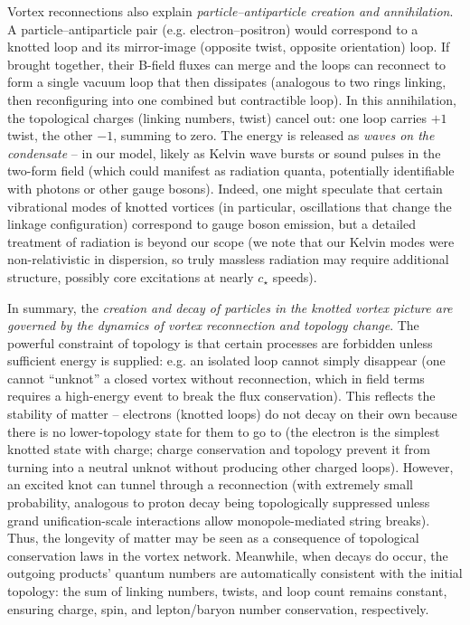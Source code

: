 \documentclass[12pt]{article}
\begin{document}
Vortex reconnections also explain \emph{particle–antiparticle creation and annihilation}. A particle–antiparticle pair (e.g. electron–positron) would correspond to a knotted loop and its mirror-image (opposite twist, opposite orientation) loop. If brought together, their B-field fluxes can merge and the loops can reconnect to form a single vacuum loop that then dissipates (analogous to two rings linking, then reconfiguring into one combined but contractible loop). In this annihilation, the topological charges (linking numbers, twist) cancel out: one loop carries $+1$ twist, the other $-1$, summing to zero. The energy is released as \emph{waves on the condensate} – in our model, likely as Kelvin wave bursts or sound pulses in the two-form field (which could manifest as radiation quanta, potentially identifiable with photons or other gauge bosons). Indeed, one might speculate that certain vibrational modes of knotted vortices (in particular, oscillations that change the linkage configuration) correspond to gauge boson emission, but a detailed treatment of radiation is beyond our scope (we note that our Kelvin modes were non-relativistic in dispersion, so truly massless radiation may require additional structure, possibly core excitations at nearly $c_{\star}$ speeds).

In summary, the \emph{creation and decay of particles in the knotted vortex picture are governed by the dynamics of vortex reconnection and topology change}. The powerful constraint of topology is that certain processes are forbidden unless sufficient energy is supplied: e.g. an isolated loop cannot simply disappear (one cannot “unknot” a closed vortex without reconnection, which in field terms requires a high-energy event to break the flux conservation). This reflects the stability of matter – electrons (knotted loops) do not decay on their own because there is no lower-topology state for them to go to (the electron is the simplest knotted state with charge; charge conservation and topology prevent it from turning into a neutral unknot without producing other charged loops). However, an excited knot can tunnel through a reconnection (with extremely small probability, analogous to proton decay being topologically suppressed unless grand unification-scale interactions allow monopole-mediated string breaks). Thus, the longevity of matter may be seen as a consequence of topological conservation laws in the vortex network. Meanwhile, when decays do occur, the outgoing products’ quantum numbers are automatically consistent with the initial topology: the sum of linking numbers, twists, and loop count remains constant, ensuring charge, spin, and lepton/baryon number conservation, respectively.
\end{document}
